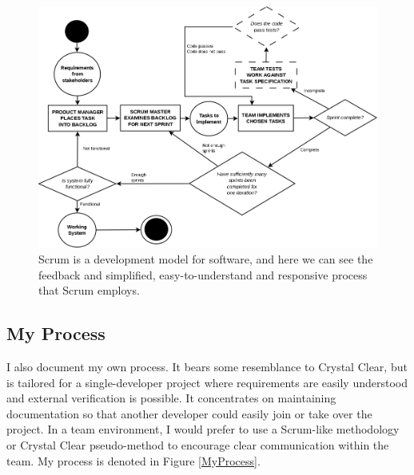 \begin{figure}
	\centering
	\includegraphics[scale=0.3]{media/Scrum}
	\caption{Scrum is a development model for software, and here we can see the feedback and
		simplified, easy-to-understand and responsive process that Scrum employs.}
	\label{ScrumFig}
\end{figure}

\subsection{My Process}
I also document my own process.
It bears some resemblance to Crystal Clear, but is tailored for a single-developer project where
requirements are easily understood and external verification is possible.
It concentrates on maintaining documentation so that another developer could easily join or take
over the project.
In a team environment, I would prefer to use a Scrum-like methodology or Crystal Clear pseudo-method
to encourage clear communication within the team.
My process is denoted in Figure \ref{MyProcess}.

